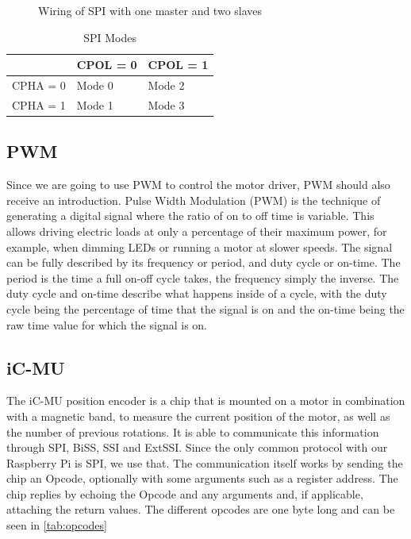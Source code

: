 \begin{figure}[H]
    \begin{center}
        
        \caption{Wiring of SPI with one master and two slaves}
        \label{fig:spi}
    \end{center}
\end{figure}

\begin{table}[H]
    \begin{tabular}{|l|l|l|}
        \hline
                 & CPOL = 0 & CPOL = 1 \\ \hline
        CPHA = 0 & Mode 0   & Mode 2   \\ \hline
        CPHA = 1 & Mode 1   & Mode 3   \\ \hline
    \end{tabular}
    \caption{SPI Modes}
    \label{tab:spi_modes}
\end{table}

\subsection{PWM}
\label{sec:background:hardware:pwm}

Since we are going to use PWM to control the motor driver, PWM should also receive an introduction.
Pulse Width Modulation (PWM) is the technique of generating a digital signal where the ratio of on to off time is variable.
This allows driving electric loads at only a percentage of their maximum power,
for example, when dimming LEDs or running a motor at slower speeds.
The signal can be fully described by its frequency or period, and duty cycle or on-time.
The period is the time a full on-off cycle takes, the frequency simply the inverse.
The duty cycle and on-time describe what happens inside of a cycle,
with the duty cycle being the percentage of time that the signal is on and the on-time being the raw time value for which the signal is on.

\subsection{iC-MU}
\label{sec:background:hardware:ic-mu}

The iC-MU position encoder is a chip that is mounted on a motor in combination with a magnetic band, to measure the current position of the motor,
as well as the number of previous rotations.
It is able to communicate this information through SPI, BiSS, SSI and ExtSSI.
Since the only common protocol with our Raspberry Pi is SPI, we use that.
The communication itself works by sending the chip an Opcode, optionally with some arguments such as a register address.
The chip replies by echoing the Opcode and any arguments and, if applicable, attaching the return values.
The different opcodes are one byte long and can be seen in \ref{tab:opcodes}

